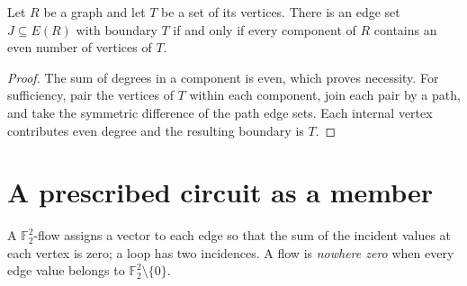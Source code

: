 \documentclass[justified,notoc,twoside,nobib,nofonts]{tufte-handout}
\newcommand{\K}{\mathbb F_2^2}
\begin{document}
\begin{lemma}[$T$-joins]\label{lem:join}
Let $R$ be a graph and let $T$ be a set of its vertices. There is an
edge set $J\subseteq E(R)$ with boundary $T$ if and only if every
component of $R$ contains an even number of vertices of $T$.
\end{lemma}

\begin{proof}
The sum of degrees in a component is even, which proves necessity.
For sufficiency, pair the vertices of $T$ within each component, join
each pair by a path, and take the symmetric difference of the path
edge sets. Each internal vertex contributes even degree and the
resulting boundary is $T$.
\end{proof}

\section{A prescribed circuit as a member}\label{sec:exact}

A $\K$-flow assigns a vector to each edge so that the sum of the
incident values at each vertex is zero; a loop has two incidences.
A flow is \emph{nowhere zero} when every edge value belongs to
$\K\setminus\{0\}$.
\end{document}
